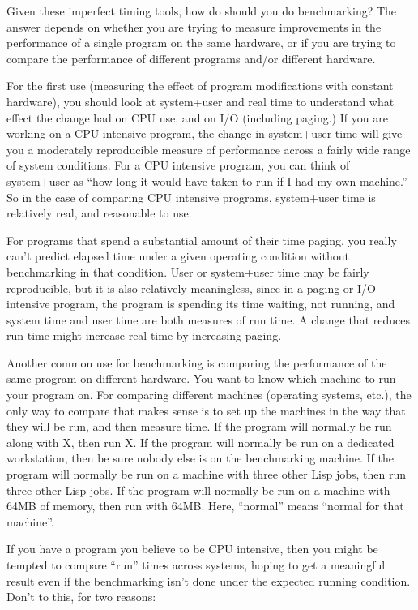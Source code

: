 Given these imperfect timing tools, how do should you do benchmarking?  The
answer depends on whether you are trying to measure improvements in the
performance of a single program on the same hardware, or if you are trying to
compare the performance of different programs and/or different hardware.

For the first use (measuring the effect of program modifications with
constant hardware), you should look at  system+user and real time to
understand what effect the change had on CPU use, and on I/O (including
paging.)  If you are working on a CPU intensive program, the change in
system+user time will give you a moderately reproducible measure of
performance across a fairly wide range of system conditions.  For a CPU
intensive program, you can think of system+user as ``how long it would have
taken to run if I had my own machine.''  So in the case of comparing CPU
intensive programs, system+user time is relatively real, and reasonable to
use.

For programs that spend a substantial amount of their time paging, you
really can't predict elapsed time under a given operating condition without
benchmarking in that condition.  User or system+user time may be fairly
reproducible, but it is also relatively meaningless, since in a paging or
I/O intensive program, the program is spending its time waiting, not
running, and system time and user time are both measures of run time.
A change that reduces run time might increase real time by increasing
paging.

Another common use for benchmarking is comparing the performance of
the same program on different hardware.  You want to know which
machine to run your program on.  For comparing different machines
(operating systems, etc.), the only way to compare that makes sense is
to set up the machines in  the way that they will
 be run, and then measure  time.  If the
program will normally be run along with X, then run X.  If the program
will normally be run on a dedicated workstation, then be sure nobody
else is on the benchmarking machine.  If the program will normally be
run on a machine with three other Lisp jobs, then run three other Lisp
jobs.  If the program will normally be run on a machine with 64MB of
memory, then run with 64MB.  Here, ``normal'' means ``normal for that
machine''.  

If you have a program you believe to be CPU intensive, then you might be
tempted to compare ``run'' times across systems, hoping to get a meaningful
result even if the benchmarking isn't done under the expected running
condition.  Don't to this, for two reasons:

